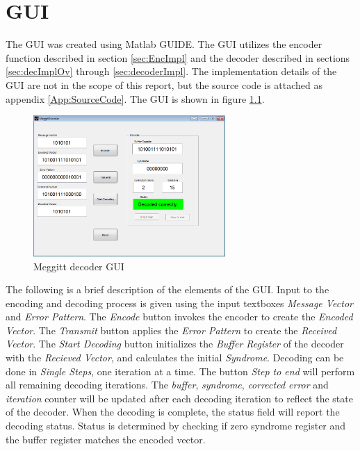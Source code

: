 \documentclass[Main]{subfiles}
\begin{document}
\chapter{GUI}

The GUI was created using Matlab GUIDE. The GUI utilizes the encoder function described in section \ref{sec:EncImpl} and the decoder described in sections \ref{sec:decImplOv} through \ref{sec:decoderImpl}. The implementation details of the GUI are not in the scope of this report, but the source code is attached as appendix \ref{App:SourceCode}.
The GUI is shown in figure \ref{fig:meggittGUI}.

\begin{figure}[h]
    \centering
    \includegraphics[width=0.65\textwidth]{figures/gui}
    \caption{Meggitt decoder GUI}
    \label{fig:meggittGUI}
\end{figure}

The following is a brief description of the elements of the GUI. Input to the encoding and decoding process is given using the input textboxes \emph{Message Vector} and \emph{Error Pattern}. The \textit{Encode} button invokes the encoder to create the \emph{Encoded Vector}. The \emph{Transmit} button applies the \emph{Error Pattern} to create the \emph{Received Vector}. The \emph{Start Decoding} button initializes the \emph{Buffer Register} of the decoder with the \emph{Recieved Vector}, and calculates the initial \emph{Syndrome}. Decoding can be done in \emph{Single Steps}, one iteration at a time. The button \emph{Step to end} will perform all remaining decoding iterations. The \emph{buffer}, \emph{syndrome}, \emph{corrected error} and \emph{iteration} counter will be updated after each decoding iteration to reflect the state of the decoder. When the decoding is complete, the status field will report the decoding status. Status is determined by checking if zero syndrome register and the buffer register matches the encoded vector.
\end{document}
